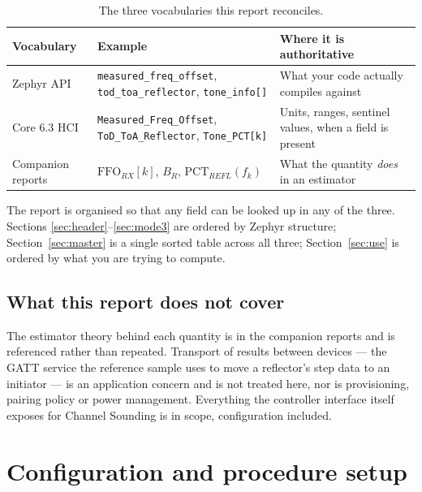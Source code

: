 \documentclass[11pt,a4paper]{article}
\newcommand{\code}[1]{\texttt{\small #1}}
\newcommand{\FFO}{\ensuremath{\mathrm{FFO}}}
\newcommand{\PCT}{\ensuremath{\mathrm{PCT}}}
\begin{document}
\begin{table}[h]
\caption{The three vocabularies this report reconciles.}
\label{tab:vocab}
\centering\small
\begin{tabular}{@{}L{26mm}L{56mm}L{56mm}@{}}
\toprule
Vocabulary & Example & Where it is authoritative \\
\midrule
Zephyr API & \code{measured\_\allowbreak{}freq\_\allowbreak{}offset}, \code{tod\_\allowbreak{}toa\_\allowbreak{}reflector}, \code{tone\_\allowbreak{}info[]} & What your code actually compiles against \\
Core 6.3 HCI & \code{Measured\_\allowbreak{}Freq\_\allowbreak{}Offset}, \code{ToD\_\allowbreak{}ToA\_\allowbreak{}Reflector}, \code{Tone\_\allowbreak{}PCT[k]} & Units, ranges, sentinel values, when a field is present \\
Companion reports & $\FFO_{RX}[k]$, $B_R$, $\PCT_{REFL}(f_k)$ & What the quantity \emph{does} in an estimator \\
\bottomrule
\end{tabular}
\end{table}

The report is organised so that any field can be looked up in any of the three. Sections
\ref{sec:header}--\ref{sec:mode3} are ordered by Zephyr structure; Section~\ref{sec:master} is a
single sorted table across all three; Section~\ref{sec:use} is ordered by what you are trying to
compute.

\subsection{What this report does not cover}

The estimator theory behind each quantity is in the companion reports and is referenced rather than
repeated. Transport of results between devices --- the GATT service the reference sample uses to move
a reflector's step data to an initiator --- is an application concern and is not treated here, nor is
provisioning, pairing policy or power management. Everything the controller interface itself exposes
for Channel Sounding is in scope, configuration included.

\section{Configuration and procedure setup}
\label{sec:config}
\end{document}
